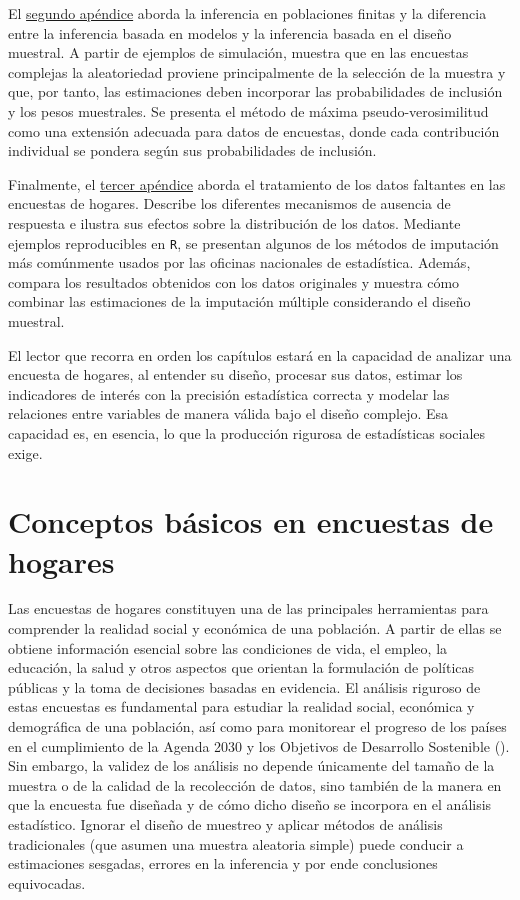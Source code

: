 \documentclass[
  spanish,
  11pt,
  letterpaper,
  oneside,
  open=any]{scrbook}
\begin{document}
El \hyperref[ap2]{segundo apéndice} aborda la inferencia en poblaciones
finitas y la diferencia entre la inferencia basada en modelos y la
inferencia basada en el diseño muestral. A partir de ejemplos de
simulación, muestra que en las encuestas complejas la aleatoriedad
proviene principalmente de la selección de la muestra y que, por tanto,
las estimaciones deben incorporar las probabilidades de inclusión y los
pesos muestrales. Se presenta el método de máxima pseudo-verosimilitud
como una extensión adecuada para datos de encuestas, donde cada
contribución individual se pondera según sus probabilidades de
inclusión.

Finalmente, el \hyperref[ap3]{tercer apéndice} aborda el tratamiento de
los datos faltantes en las encuestas de hogares. Describe los diferentes
mecanismos de ausencia de respuesta e ilustra sus efectos sobre la
distribución de los datos. Mediante ejemplos reproducibles en
\texttt{R}, se presentan algunos de los métodos de imputación más
comúnmente usados por las oficinas nacionales de estadística. Además,
compara los resultados obtenidos con los datos originales y muestra cómo
combinar las estimaciones de la imputación múltiple considerando el
diseño muestral.

El lector que recorra en orden los capítulos estará en la capacidad de
analizar una encuesta de hogares, al entender su diseño, procesar sus
datos, estimar los indicadores de interés con la precisión estadística
correcta y modelar las relaciones entre variables de manera válida bajo
el diseño complejo. Esa capacidad es, en esencia, lo que la producción
rigurosa de estadísticas sociales exige.


\chapter{Conceptos básicos en encuestas de hogares}\label{cap2}

Las encuestas de hogares constituyen una de las principales herramientas
para comprender la realidad social y económica de una población. A
partir de ellas se obtiene información esencial sobre las condiciones de
vida, el empleo, la educación, la salud y otros aspectos que orientan la
formulación de políticas públicas y la toma de decisiones basadas en
evidencia. El análisis riguroso de estas encuestas es fundamental para
estudiar la realidad social, económica y demográfica de una población,
así como para monitorear el progreso de los países en el cumplimiento de
la Agenda 2030 y los Objetivos de Desarrollo Sostenible
(). Sin embargo, la validez de los análisis no depende únicamente
del tamaño de la muestra o de la calidad de la recolección de datos,
sino también de la manera en que la encuesta fue diseñada y de cómo
dicho diseño se incorpora en el análisis estadístico. Ignorar el diseño
de muestreo y aplicar métodos de análisis tradicionales (que asumen una
muestra aleatoria simple) puede conducir a estimaciones sesgadas,
errores en la inferencia y por ende conclusiones equivocadas.
\end{document}
